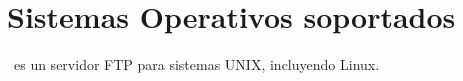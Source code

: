 
\section{Sistemas Operativos soportados}

  \vsftpd\ es un servidor FTP para sistemas UNIX, incluyendo Linux.
  
